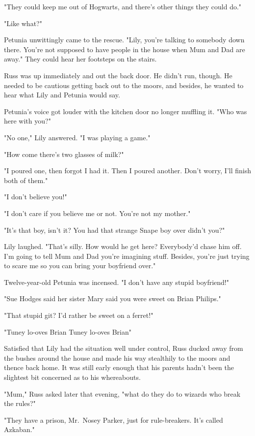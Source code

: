 "They could keep me out of{\el} Hogwarts, and there's other{\el} things they could do."

"Like what?"

Petunia unwittingly came to the rescue. "Lily, you're talking to somebody down there. You're not supposed to have people in the house when Mum and Dad are away." They could hear her footsteps on the stairs.

Russ was up immediately and out the back door. He didn't run, though. He needed to be cautious getting back out to the moors, and besides, he wanted to hear what Lily and Petunia would say.

Petunia's voice got louder with the kitchen door no longer muffling it. "Who was here with you?"

"No one," Lily answered. "I was playing a game."

"How come there's two glasses of milk?"

"I poured one, then forgot I had it. Then I poured another. Don't worry, I'll finish both of them."

"I don't believe you!"

"I don't care if you believe me or not. You're not my mother."

"It's that boy, isn't it? You had that strange Snape boy over didn't you?"

Lily laughed. "That's silly. How would he get here? Everybody'd chase him off. I'm going to tell Mum and Dad you're imagining stuff. Besides, you're just trying to scare me so you can bring your boyfriend over."

Twelve-year-old Petunia was incensed. "I don't have any stupid boyfriend!"

"Sue Hodges said her sister Mary said you were sweet on Brian Philips."

"That stupid git? I'd rather be sweet on a ferret!"

"Tuney lo-oves Brian{\el} Tuney lo-oves Brian{\el}"

Satisfied that Lily had the situation well under control, Russ ducked away from the bushes around the house and made his way stealthily to the moors and thence back home. It was still early enough that his parents hadn't been the slightest bit concerned as to his whereabouts.

"Mum," Russ asked later that evening, "what do they do to wizards who break the rules?"

"They have a prison, Mr.~Nosey Parker, just for rule-breakers. It's called Azkaban."

